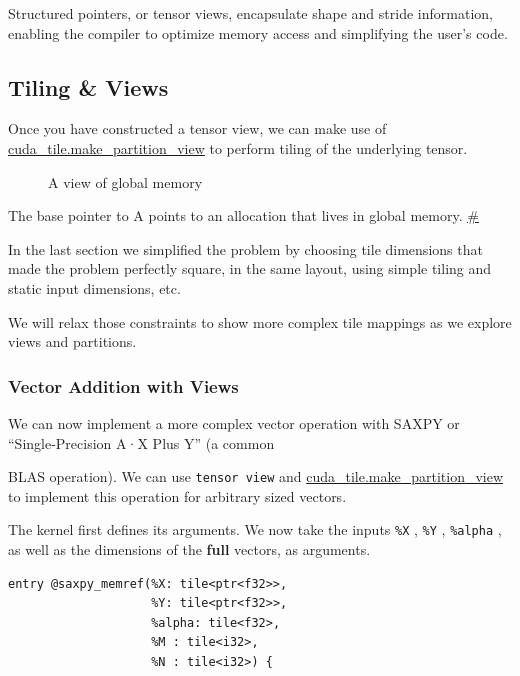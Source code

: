 \documentclass{article}
\begin{document}
Structured pointers, or tensor views, encapsulate shape and stride information, enabling the compiler to optimize memory access and simplifying the user's code.



\subsection{Tiling \& Views}

Once you have constructed a tensor view, we can make use of \href{https://docs.nvidia.com/cuda/tile-ir/latest/sections/operations.html#op-cuda-tile-make-partition-view}{cuda\_tile.make\_partition\_view} to perform tiling of the underlying tensor.


\begin{figure}[!ht]\centering

\caption{A view of global memory}
\end{figure}
The base pointer to A points to an allocation that lives in global memory. \href{https://docs.nvidia.com/cuda/tile-ir/latest/sections/prog_model.html#id3}{\#}



In the last section we simplified the problem by choosing tile dimensions that made the problem perfectly square, in the same layout, using simple tiling and static input dimensions, etc.

We will relax those constraints to show more complex tile mappings as we explore views and partitions.


\subsubsection{Vector Addition with Views}

We can now implement a more complex vector operation with SAXPY or ``Single-Precision A·X Plus Y'' (a common

BLAS operation). We can use \texttt{tensor view} and \href{https://docs.nvidia.com/cuda/tile-ir/latest/sections/operations.html#op-cuda-tile-make-partition-view}{cuda\_tile.make\_partition\_view} to implement this operation for arbitrary sized vectors.


The kernel first defines its arguments. We now take the inputs \texttt{\%X} , \texttt{\%Y} , \texttt{\%alpha} , as well as the dimensions of the \textbf{full} vectors, as arguments.


\begin{lstlisting}
entry @saxpy_memref(%X: tile<ptr<f32>>,
                    %Y: tile<ptr<f32>>,
                    %alpha: tile<f32>,
                    %M : tile<i32>,
                    %N : tile<i32>) {
\end{lstlisting}
\end{document}
